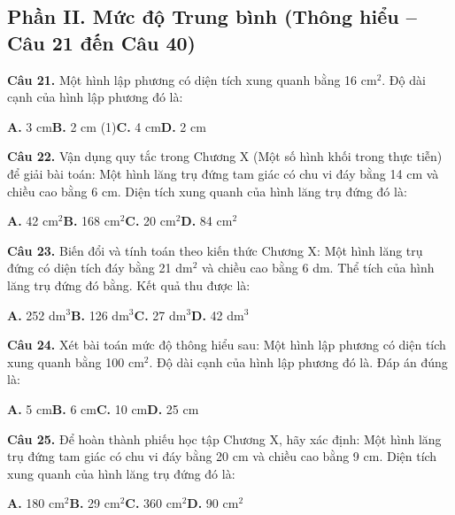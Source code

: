 \documentclass[11pt,a4paper]{article}
\begin{document}
\subsection*{\color{accent} Phần II. Mức độ Trung bình (Thông hiểu -- Câu 21 đến Câu 40)}
\textbf{\color{primary} Câu 21.} Một hình lập phương có diện tích xung quanh bằng 16 cm$^2$. Độ dài cạnh của hình lập phương đó là:\par
\hspace*{1.5em}\textbf{A.} 3 cm\quad\quad \textbf{B.} 2 cm (1)\quad\quad \textbf{C.} 4 cm\quad\quad \textbf{D.} 2 cm\par\vspace{2pt}
\textbf{\color{primary} Câu 22.} Vận dụng quy tắc trong Chương X (Một số hình khối trong thực tiễn) để giải bài toán: Một hình lăng trụ đứng tam giác có chu vi đáy bằng 14 cm và chiều cao bằng 6 cm. Diện tích xung quanh của hình lăng trụ đứng đó là:\par
\hspace*{1.5em}\textbf{A.} 42 cm$^2$\quad\quad \textbf{B.} 168 cm$^2$\quad\quad \textbf{C.} 20 cm$^2$\quad\quad \textbf{D.} 84 cm$^2$\par\vspace{2pt}
\textbf{\color{primary} Câu 23.} Biến đổi và tính toán theo kiến thức Chương X: Một hình lăng trụ đứng có diện tích đáy bằng 21 dm$^2$ và chiều cao bằng 6 dm. Thể tích của hình lăng trụ đứng đó bằng. Kết quả thu được là:\par
\hspace*{1.5em}\textbf{A.} 252 dm$^3$\quad\quad \textbf{B.} 126 dm$^3$\quad\quad \textbf{C.} 27 dm$^3$\quad\quad \textbf{D.} 42 dm$^3$\par\vspace{2pt}
\textbf{\color{primary} Câu 24.} Xét bài toán mức độ thông hiểu sau: Một hình lập phương có diện tích xung quanh bằng 100 cm$^2$. Độ dài cạnh của hình lập phương đó là. Đáp án đúng là:\par
\hspace*{1.5em}\textbf{A.} 5 cm\quad\quad \textbf{B.} 6 cm\quad\quad \textbf{C.} 10 cm\quad\quad \textbf{D.} 25 cm\par\vspace{2pt}
\textbf{\color{primary} Câu 25.} Để hoàn thành phiếu học tập Chương X, hãy xác định: Một hình lăng trụ đứng tam giác có chu vi đáy bằng 20 cm và chiều cao bằng 9 cm. Diện tích xung quanh của hình lăng trụ đứng đó là:\par
\hspace*{1.5em}\textbf{A.} 180 cm$^2$\quad\quad \textbf{B.} 29 cm$^2$\quad\quad \textbf{C.} 360 cm$^2$\quad\quad \textbf{D.} 90 cm$^2$\par\vspace{2pt}
\end{document}
